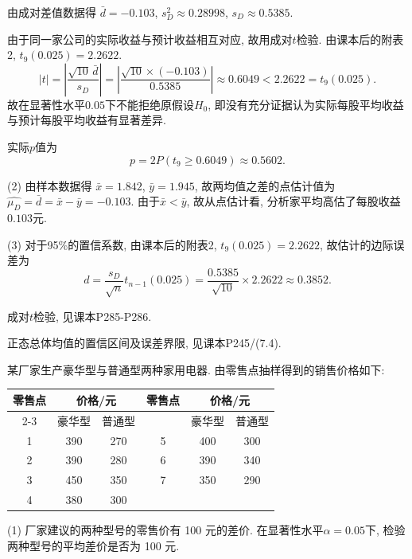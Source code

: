 \documentclass[standard]{ExBook}
\renewenvironment{shaded}{%
  \def\FrameCommand{\fboxsep=\FrameSep \colorbox{shadecolor}}%
  \MakeFramed{\advance\hsize-\width \FrameRestore}%
}{%
  \endMakeFramed
}
\begin{document}
\begin{qitems}
由成对差值数据得
$
\bar{d}=-0.103
$,
$
s_D^2\approx0.28998
$,
$
s_D\approx0.5385
$.

由于同一家公司的实际收益与预计收益相互对应, 故用成对$t$检验. 由课本后的附表2, $t_9(0.025)=2.2622$.
$$
|t|
=
\left|
\frac{\sqrt{10}\,\bar{d}}{s_D}
\right|
=
\left|
\frac{\sqrt{10}\times(-0.103)}{0.5385}
\right|
\approx0.6049
<
2.2622
=
t_9(0.025).
$$
故在显著性水平$0.05$下不能拒绝原假设$H_0$, 即没有充分证据认为实际每股平均收益与预计每股平均收益有显著差异.

实际$p$值为
$$
p
=
2P\left(t_9\geq0.6049\right)
\approx0.5602.
$$

(2) 由样本数据得
$
\bar{x}=1.842
$,
$
\bar{y}=1.945
$,
故两均值之差的点估计值为
$
\widehat{\mu_D}
=\bar{d}
=\bar{x}-\bar{y}
=-0.103
$.
由于$\bar{x}<\bar{y}$, 故从点估计看, 分析家平均高估了每股收益$0.103$元.

(3) 对于95\%的置信系数, 由课本后的附表2, $t_9(0.025)=2.2622$, 故估计的边际误差为
$$
d
=
\frac{s_D}{\sqrt{n}}t_{n-1}(0.025)
=
\frac{0.5385}{\sqrt{10}}\times2.2622
\approx0.3852.
$$

\textcolor{themeColor}{\selectfont {} 成对$t$检验, 见课本P285-P286.}

\textcolor{themeColor}{\selectfont {} 正态总体均值的置信区间及误差界限, 见课本P245/(7.4).}

\vspace{2.5cm-5em}

    \begin{bbox}
    \begin{shaded}
        \qitem
某厂家生产豪华型与普通型两种家用电器. 由零售点抽样得到的销售价格如下:
\begin{center}
\setlength{\tabcolsep}{21pt}
\begin{tabular}{c|cc||c|cc}
\hline
\multirow{2}{*}{零售点} & \multicolumn{2}{c||}{价格/元} & \multirow{2}{*}{零售点} & \multicolumn{2}{c}{价格/元} \\ 
\cline{2-3} \cline{5-6}
 & \multicolumn{1}{c}{豪华型} & \multicolumn{1}{c||}{普通型} & & \multicolumn{1}{c}{豪华型} & \multicolumn{1}{c}{普通型} \\ \hline
1 & 390 & 270 & 5 & 400 & 300 \\
2 & 390 & 280 & 6 & 390 & 340 \\
3 & 450 & 350 & 7 & 350 & 290 \\
4 & 380 & 300 &  &  &  \\
\hline
\end{tabular}
\end{center}
(1) 厂家建议的两种型号的零售价有 100 元的差价. 在显著性水平$\alpha=0.05$下, 检验两种型号的平均差价是否为 100 元.


\end{shaded}
\end{bbox}
\end{qitems}
\end{document}
